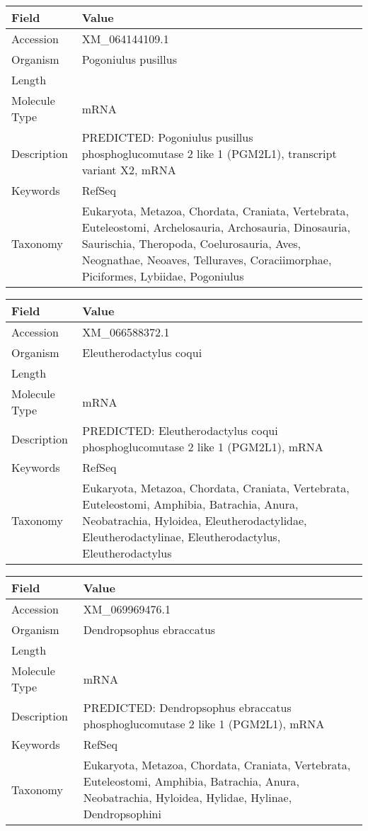 \documentclass[10pt]{article}
\begin{document}
\vspace{1em}
{\footnotesize
\begin{longtable}{>{\raggedright\arraybackslash}p{4.5cm} >{\raggedright\arraybackslash}p{11.5cm}}
\textbf{Field} & \textbf{Value} \\
\hline
Accession & XM\_064144109.1 \\
Organism & Pogoniulus pusillus \\
Length & 2902 \\
Molecule Type & mRNA \\
Description & PREDICTED: Pogoniulus pusillus phosphoglucomutase 2 like 1 (PGM2L1), transcript variant X2, mRNA \\
Keywords & RefSeq \\
Taxonomy & Eukaryota, Metazoa, Chordata, Craniata, Vertebrata, Euteleostomi, Archelosauria, Archosauria, Dinosauria, Saurischia, Theropoda, Coelurosauria, Aves, Neognathae, Neoaves, Telluraves, Coraciimorphae, Piciformes, Lybiidae, Pogoniulus \\
\end{longtable}
}

\vspace{1em}
{\footnotesize
\begin{longtable}{>{\raggedright\arraybackslash}p{4.5cm} >{\raggedright\arraybackslash}p{11.5cm}}
\textbf{Field} & \textbf{Value} \\
\hline
Accession & XM\_066588372.1 \\
Organism & Eleutherodactylus coqui \\
Length & 3696 \\
Molecule Type & mRNA \\
Description & PREDICTED: Eleutherodactylus coqui phosphoglucomutase 2 like 1 (PGM2L1), mRNA \\
Keywords & RefSeq \\
Taxonomy & Eukaryota, Metazoa, Chordata, Craniata, Vertebrata, Euteleostomi, Amphibia, Batrachia, Anura, Neobatrachia, Hyloidea, Eleutherodactylidae, Eleutherodactylinae, Eleutherodactylus, Eleutherodactylus \\
\end{longtable}
}

\vspace{1em}
{\footnotesize
\begin{longtable}{>{\raggedright\arraybackslash}p{4.5cm} >{\raggedright\arraybackslash}p{11.5cm}}
\textbf{Field} & \textbf{Value} \\
\hline
Accession & XM\_069969476.1 \\
Organism & Dendropsophus ebraccatus \\
Length & 2752 \\
Molecule Type & mRNA \\
Description & PREDICTED: Dendropsophus ebraccatus phosphoglucomutase 2 like 1 (PGM2L1), mRNA \\
Keywords & RefSeq \\
Taxonomy & Eukaryota, Metazoa, Chordata, Craniata, Vertebrata, Euteleostomi, Amphibia, Batrachia, Anura, Neobatrachia, Hyloidea, Hylidae, Hylinae, Dendropsophini \\
\end{longtable}
}
\end{document}
